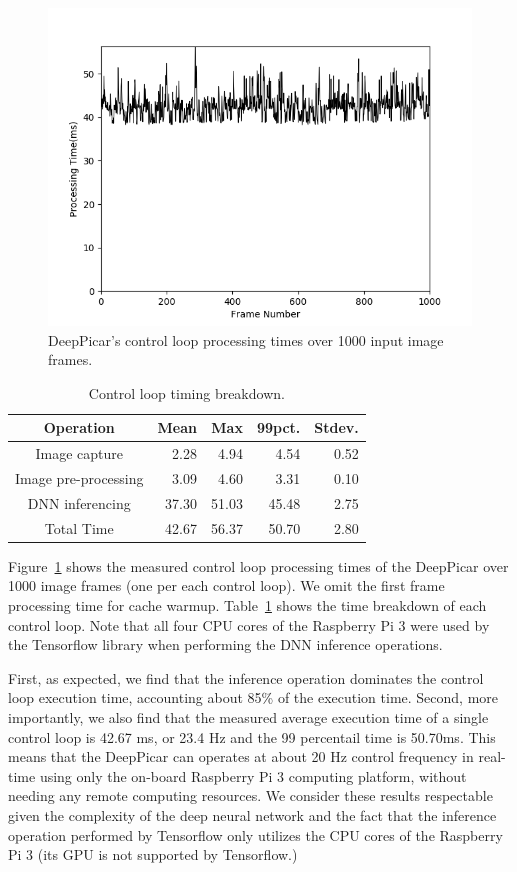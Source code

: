 
\begin{figure}[t]
  \centering
  \includegraphics[width=.45\textwidth]{Total_Processing_Time}
  \caption{DeepPicar's control loop processing times over 1000 input image frames.}
  \label{fig:control-loop-timing}
\end{figure}

\begin{table}[t]
  \centering
  \begin{tabular} {| c | r | r | r | r |}
    \hline
    \textbf{Operation} & \textbf{Mean} & \textbf{Max} &   \textbf{99pct.} & \textbf{Stdev.} \\ \hline
    Image capture        & 2.28  &  4.94 &  4.54  & 0.52 \\ \hline
    Image pre-processing & 3.09  &  4.60 &  3.31  & 0.10 \\ \hline
    DNN inferencing      & 37.30 & 51.03 & 45.48  & 2.75 \\ \hline
    Total Time           & 42.67 & 56.37 & 50.70  & 2.80 \\ \hline
  \end{tabular}
  \caption{Control loop timing breakdown.}
  \label{tbl:control-loop-breakdown}
\end{table}

Figure~\ref{fig:control-loop-timing} shows the measured control loop 
processing times of the DeepPicar over 1000 image frames (one per each
control loop). We omit the first frame processing time for cache
warmup. Table~\ref{tbl:control-loop-breakdown} shows the time
breakdown of each control loop. Note that all four CPU cores of the
Raspberry Pi 3 were used by the Tensorflow library when performing the
DNN inference operations.

First, as expected, we find that the inference operation
dominates the control loop execution time, accounting about 85\% of
the execution time.
Second, more importantly, we also find that the measured average
execution time of a single control loop is 42.67 ms, or 23.4 Hz and
the 99 percentail time is 50.70ms.
This means that the DeepPicar can operates
at about 20 Hz control frequency in real-time using only the on-board
Raspberry Pi 3 computing platform, without needing any remote computing
resources. We consider these results respectable given the complexity
of the deep neural network  and the fact that the inference operation
performed by Tensorflow only utilizes the CPU cores of the
Raspberry Pi 3 (its GPU is not supported by Tensorflow.)

